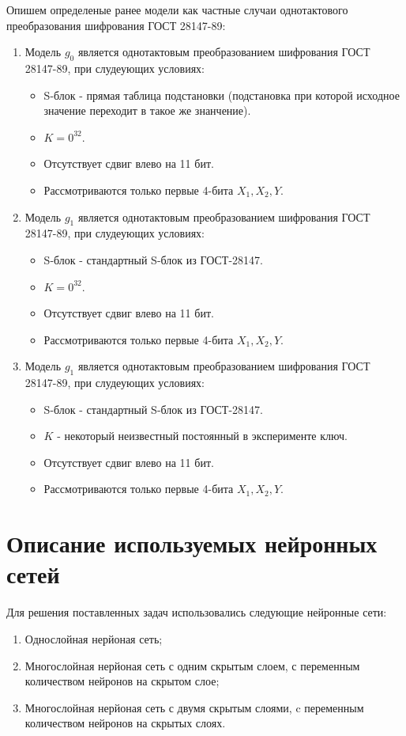 \documentclass[a4paper,12pt,twoside]{article}
\begin{document}
	\bigskip
	\noindent Опишем определеные ранее модели как частные случаи однотактового преобразования шифрования ГОСТ 28147-89:
	\begin{enumerate}
		\item Модель $g_0$ является однотактовым преобразованием  шифрования ГОСТ 28147-89, при слудеующих условиях:
			\begin{itemize}
			\item S-блок - прямая таблица подстановки (подстановка при которой исходное значение переходит в такое же знанчение).
			\item $K = 0^{32}$.
			\item Отсутствует сдвиг влево на 11 бит.
			\item Рассмотриваются только первые 4-бита $X_1, X_2, Y$.
			\end{itemize}
		\item Модель $g_1$ является однотактовым преобразованием  шифрования ГОСТ 28147-89, при слудеующих условиях:
		\begin{itemize}
			\item S-блок - стандартный S-блок из ГОСТ-28147.
			\item $K = 0^{32}$.
			\item Отсутствует сдвиг влево на 11 бит.
			\item Рассмотриваются только первые 4-бита $X_1, X_2, Y$.
		\end{itemize}
		\item Модель $g_1$ является однотактовым преобразованием  шифрования ГОСТ 28147-89, при слудеующих условиях:
		\begin{itemize}
			\item S-блок - стандартный S-блок из ГОСТ-28147.
			\item $K$ - некоторый неизвестный постоянный в эксперименте ключ.
			\item Отсутствует сдвиг влево на 11 бит.
			\item Рассмотриваются только первые 4-бита $X_1, X_2, Y$.
		\end{itemize}
	\end{enumerate}
	
	\newpage
	\section{Описание используемых нейронных сетей}	
	\bigskip
	\noindent Для решения поставленных задач использовались следующие нейронные сети:
	
	\begin{enumerate}
		\item Однослойная нерйоная сеть;	
		\item Многослойная нерйоная сеть с одним скрытым слоем, с переменным количеством нейронов на скрытом слое;
		\item Многослойная нерйоная сеть с двумя скрытым слоями, c 
		переменным количеством нейронов на скрытых слоях.
	\end{enumerate}
	
\end{document}
